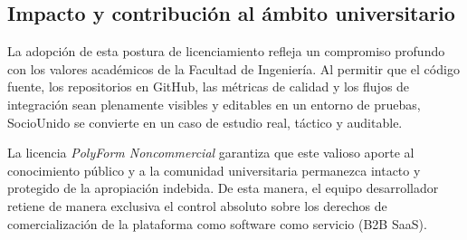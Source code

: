 \subsection{Impacto y contribución al ámbito universitario}

La adopción de esta postura de licenciamiento refleja un compromiso profundo con los valores académicos de la Facultad de Ingeniería. Al permitir que el código fuente, los repositorios en GitHub, las métricas de calidad y los flujos de integración sean plenamente visibles y editables en un entorno de pruebas, SocioUnido se convierte en un caso de estudio real, táctico y auditable. 

La licencia \textit{PolyForm Noncommercial} garantiza que este valioso aporte al conocimiento público y a la comunidad universitaria permanezca intacto y protegido de la apropiación indebida. De esta manera, el equipo desarrollador retiene de manera exclusiva el control absoluto sobre los derechos de comercialización de la plataforma como software como servicio (B2B SaaS).
